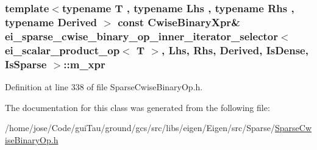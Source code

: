 \hypertarget{classei__sparse__cwise__binary__op__inner__iterator__selector_3_01ei__scalar__product__op_3_01_tea59c78454e1066b1083644fef716fd4_adb80345e69e67b853b7ccef6e1120792}{
\subsubsection[{m\-\_\-xpr}]{\setlength{\rightskip}{0pt plus 5cm}template$<$typename T , typename Lhs , typename Rhs , typename Derived $>$ const {\bf Cwise\-Binary\-Xpr}\& {\bf ei\-\_\-sparse\-\_\-cwise\-\_\-binary\-\_\-op\-\_\-inner\-\_\-iterator\-\_\-selector}$<$ {\bf ei\-\_\-scalar\-\_\-product\-\_\-op}$<$ T $>$, Lhs, Rhs, Derived, {\bf Is\-Dense}, {\bf Is\-Sparse} $>$\-::m\-\_\-xpr\hspace{0.3cm}{\ttfamily [protected]}}}\label{classei__sparse__cwise__binary__op__inner__iterator__selector_3_01ei__scalar__product__op_3_01_tea59c78454e1066b1083644fef716fd4_adb80345e69e67b853b7ccef6e1120792}


Definition at line 338 of file Sparse\-Cwise\-Binary\-Op.\-h.



The documentation for this class was generated from the following file\-:\begin{DoxyCompactItemize}
\item 
/home/jose/\-Code/gui\-Tau/ground/gcs/src/libs/eigen/\-Eigen/src/\-Sparse/\hyperlink{_sparse_cwise_binary_op_8h}{Sparse\-Cwise\-Binary\-Op.\-h}\end{DoxyCompactItemize}
